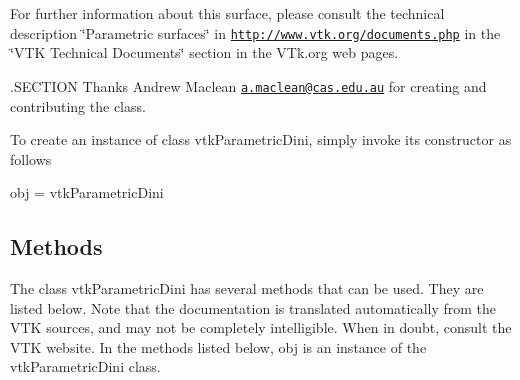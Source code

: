 For further information about this surface, please consult the technical description \char`\"{}\-Parametric surfaces\char`\"{} in \href{http://www.vtk.org/documents.php}{\tt http\-://www.\-vtk.\-org/documents.\-php} in the \char`\"{}\-V\-T\-K Technical Documents\char`\"{} section in the V\-Tk.\-org web pages.

.S\-E\-C\-T\-I\-O\-N Thanks Andrew Maclean \href{mailto:a.maclean@cas.edu.au}{\tt a.\-maclean@cas.\-edu.\-au} for creating and contributing the class.

To create an instance of class vtk\-Parametric\-Dini, simply invoke its constructor as follows \begin{DoxyVerb}  obj = vtkParametricDini
\end{DoxyVerb}
 \hypertarget{vtkwidgets_vtkxyplotwidget_Methods}{}\subsection{Methods}\label{vtkwidgets_vtkxyplotwidget_Methods}
The class vtk\-Parametric\-Dini has several methods that can be used. They are listed below. Note that the documentation is translated automatically from the V\-T\-K sources, and may not be completely intelligible. When in doubt, consult the V\-T\-K website. In the methods listed below, {\ttfamily obj} is an instance of the vtk\-Parametric\-Dini class. 
